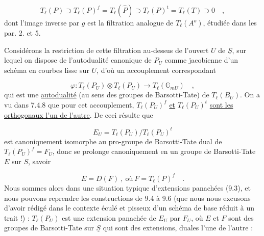 \begin{equation}\tag{12.8.6}
T_\ell(P) \supset T_\ell(P)^f = T_\ell(\hat{P}) \supset T_\ell(P)^t = T_\ell(T) \supset 0 \quad ,
\end{equation}
dont l'image inverse par $g$ est la filtration analogue de $T_\ell(A^{o})$, étudiée dans les par. 2. et 5.

Considérons la restriction de cette filtration au-dessus de l'ouvert $U$ de $\underline{S}$, sur lequel on dispose de l'autodualité canonique de $P_U$ comme jacobienne d'un schéma en courbes lisse sur $U$, d'où un accouplement correspondant



\begin{equation}\tag{12.8.7}
\varphi : T_\ell(P_U) \otimes T_\ell(P_U) \longrightarrow T_\ell(\mathbb{G}_{mU}) \quad ,
\end{equation}
qui est une \underline{autodualité} (au sens des groupes de Barsotti-Tate) de $T_\ell(B_U)$. On a vu dans 7.4.8 \quad que pour cet accouplement, $T_\ell(P_U)^f$ \underline{et} $T_\ell(P_U)^t$ \underline{sont les orthogonaux l'un de l'autre}. De ceci résulte que

\begin{equation*}
E_U = T_\ell(P_U)/T_\ell(P_U)^t
\end{equation*}
est canoniquement isomorphe au pro-groupe de Barsotti-Tate dual de $T_\ell(P_U)^f = F_U$, donc se prolonge canoniquement en un groupe de Barsotti-Tate $E$ sur $S$, savoir

\begin{equation}\tag{12.8.8}
E = D(F) \ , \ \text{où} \ F = T_\ell(P)^f \quad .
\end{equation}
Nous sommes alors dans une situation typique d'extensions panachées (9.3), et nous pouvons reprendre les constructions de 9.4 à 9.6 (que nous nous excusons d'avoir rédigé dans le contexte éculé et pisseux d'un schéma de base réduit à un trait !) : $T_\ell(P_U)$ est une extension panachée de $E_U$ par $F_U$, où $E$ et $F$ sont des groupes de Barsotti-Tate sur $\underline{S}$ qui sont des extensions, duales l'une de l'autre :


